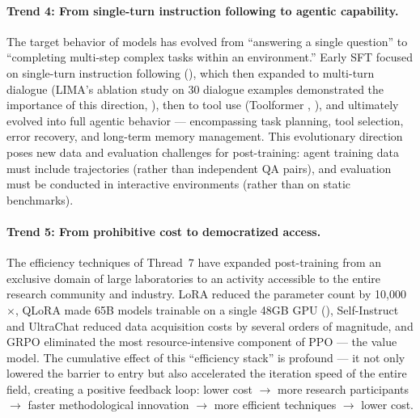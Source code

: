 \paragraph{Trend 4: From single-turn instruction following to agentic capability.}
The target behavior of models has evolved from ``answering a single question''
to ``completing multi-step complex tasks within an environment.''
Early SFT focused on single-turn instruction following (),
which then expanded to multi-turn dialogue (LIMA's ablation study on 30 dialogue examples demonstrated the importance of this direction,
),
then to tool use (Toolformer \cite{schick2023toolformer}, ),
and ultimately evolved into full agentic behavior ---
encompassing task planning, tool selection, error recovery, and long-term memory management.
This evolutionary direction poses new data and evaluation challenges for post-training:
agent training data must include trajectories (rather than independent QA pairs),
and evaluation must be conducted in interactive environments (rather than on static benchmarks).

\paragraph{Trend 5: From prohibitive cost to democratized access.}
The efficiency techniques of Thread~7 have expanded post-training from an exclusive domain of large laboratories
to an activity accessible to the entire research community and industry.
LoRA \cite{hu2022lora} reduced the parameter count by 10,000$\times$,
QLoRA \cite{dettmers2023qlora} made 65B models trainable on a single 48GB GPU
(),
Self-Instruct \cite{wang2023selfinstruct} and UltraChat \cite{ding2023ultrachat}
reduced data acquisition costs by several orders of magnitude,
and GRPO \cite{shao2024grpo} eliminated the most resource-intensive component of PPO --- the value model.
The cumulative effect of this ``efficiency stack'' is profound ---
it not only lowered the barrier to entry but also accelerated the iteration speed of the entire field,
creating a positive feedback loop:
lower cost $\rightarrow$ more research participants $\rightarrow$
faster methodological innovation $\rightarrow$ more efficient techniques $\rightarrow$ lower cost.

